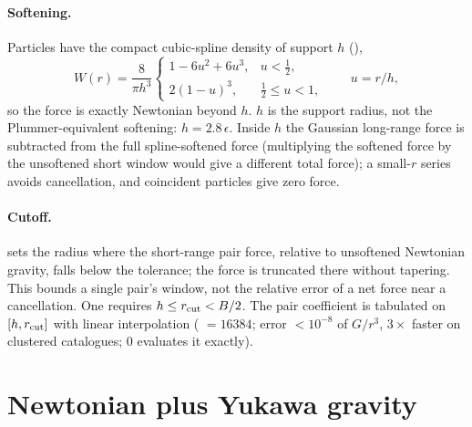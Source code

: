 \paragraph*{Softening.} Particles have the compact cubic-spline density of support $h$
(),
\begin{equation}
W(r)=\frac{8}{\pi h^3}\begin{cases}1-6u^2+6u^3, & u<\frac12,\\ 2(1-u)^3, & \frac12\le u<1,\end{cases}\qquad u=r/h,
\end{equation}
so the force is exactly Newtonian beyond $h$. $h$ is the support radius, not the Plummer-equivalent softening:
$h=2.8\,\epsilon$. Inside $h$ the Gaussian long-range force is subtracted from the full spline-softened force
(multiplying the softened force by the unsoftened short window would give a different total force); a small-$r$
series avoids cancellation, and coincident particles give zero force.

\paragraph*{Cutoff.}  sets the radius where the short-range pair force,
relative to unsoftened Newtonian gravity, falls below the tolerance; the force is truncated there without tapering.
This bounds a single pair's window, not the relative error of a net force near a cancellation. One requires
$h\le r_{\rm cut}<B/2$. The pair coefficient is tabulated on $[h,r_{\rm cut}]$ with linear interpolation
( $=16384$; error $<10^{-8}$ of $G/r^3$, $3\times$ faster on clustered
catalogues; 0 evaluates it exactly).

\section{Newtonian plus Yukawa gravity}\label{sec:sr-yukawa}

